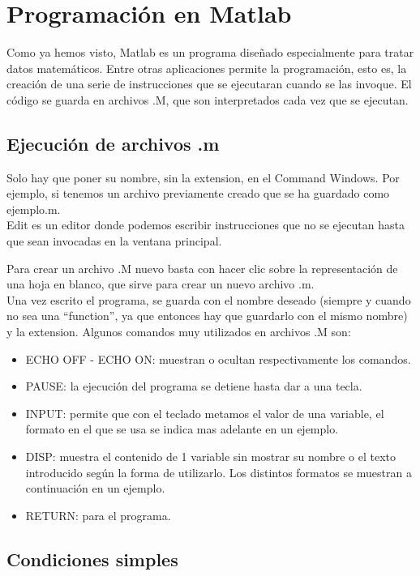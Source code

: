 \chapter{Programación en Matlab}

Como ya hemos visto, Matlab es un programa diseñado especialmente para tratar datos matemáticos. Entre otras aplicaciones permite la programación, esto es, la creación de una serie de instrucciones que se ejecutaran cuando se las invoque. El código se guarda en archivos .M, que son interpretados cada vez que se ejecutan.

\section{Ejecución de archivos .m}

Solo hay que poner su nombre, sin la extension, en el Command Windows. Por ejemplo, si tenemos un archivo previamente creado que se ha guardado como ejemplo.m.\\

Edit es un editor donde podemos escribir instrucciones que no se ejecutan hasta que sean invocadas en la ventana principal.

Para crear un archivo .M nuevo basta con hacer clic sobre la representación de una hoja en blanco, que sirve para crear un nuevo archivo .m.\\

Una vez escrito el programa, se guarda con el nombre deseado (siempre y cuando no sea una “function”, ya que entonces hay que guardarlo con el mismo nombre) y la extension. Algunos comandos muy utilizados en archivos .M son:

\begin{itemize}
\item ECHO OFF - ECHO ON: muestran o ocultan respectivamente los comandos.
\item PAUSE: la ejecución del programa se detiene hasta dar a una tecla.
\item INPUT: permite que con el teclado metamos el valor de una variable, el formato en el que se usa se indica mas adelante en un ejemplo.
\item DISP: muestra el contenido de 1 variable sin mostrar su nombre o el texto introducido según la forma de utilizarlo. Los distintos formatos se muestran a continuación en un ejemplo.
\item RETURN: para el programa.
\end{itemize}

\section{Condiciones simples}

